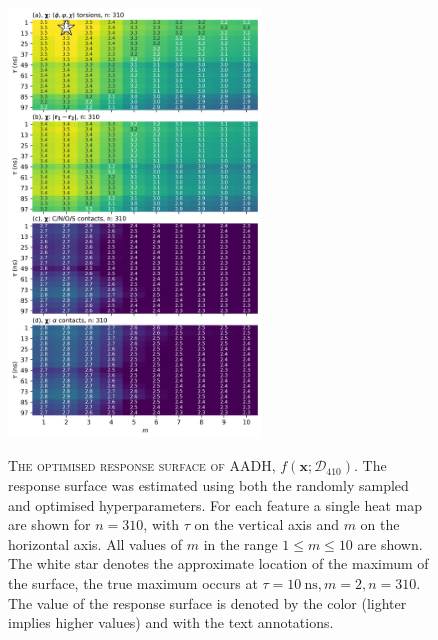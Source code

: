 \begin{figure}
    \centering
    \caption[The optimised response surface of AADH]{\textsc{The optimised response surface of AADH, $f\left(\mathbf{x}; \mathcal{D}_{410}\right)$}. The response surface was estimated using both the randomly sampled and optimised hyperparameters. For each feature a single heat map are shown for $n=310$, with $\tau$ on the vertical axis and $m$ on the horizontal axis. All values of $m$ in the range $1\le m \le 10$ are shown. The white star denotes the approximate location of the maximum of the surface, the true maximum occurs at $\tau=\SI{10}{\nano\second}, m=2, n=310$. The value of the response surface is denoted by the color (lighter implies higher values) and with the text annotations.}
    \includegraphics[width=0.6\textwidth]{chapters/msm_optimization/figures/aadh_response_surface_d_opt.png.png}
    \label{fig:aadh_rsm_opt}
\end{figure}


